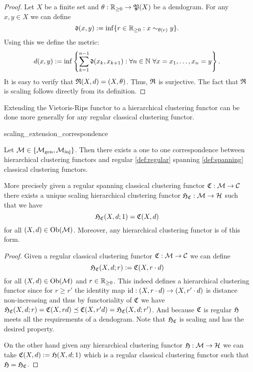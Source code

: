 \begin{proof}
Let $X$ be a finite set and $\theta: \mathbb R_{\geq0} \to \mathfrak{P}(X)$ be a dendogram. For any $x,y \in X$ we can define
$$
\mathfrak{d}(x,y) := \inf\{r \in \mathbb R_{\geq0}: x \sim_{\theta(r)} y\}.
$$
Using this we define the metric:
$$
d(x,y) := \inf\left\{\sum_{k=1}^{n-1} \mathfrak{d}(x_k, x_{k+1}): \forall n \in \mathbb N \ \forall x = x_1, \dots, x_n = y\right\}.
$$
It is easy to verify that $\mathfrak{R}(X,d) = (X,\theta)$. Thus, $\mathfrak{R}$ is surjective. The fact that $\mathfrak{R}$ is scaling follows directly from its definition.
\end{proof}



Extending the Vietoris-Rips functor to a hierarchical clustering functor can be done more generally for any regular classical clustering functor.
\begin{proposition}{}{scaling_extension_correspondence}

Let $\mathcal{M} \in \{{\mathcal{M}_\mathrm{gen}},{\mathcal{M}_\mathrm{inj}}\}$. Then there exists a one to one correspondence between
hierarchical clustering functors and regular \ref{def:regular} spanning \ref{def:spanning} classical clustering functors.

\medskip
More precisely given a regular spanning classical clustering functor $\mathfrak{C}: \mathcal{M} \to \mathcal{C}$ there exists a unique scaling hierarchical clustering functor $\mathfrak{H}_{\mathfrak{C}}: \mathcal{M} \to \mathcal{H}$ such that we have
$$
\mathfrak{H}_{\mathfrak{C}}(X,d; 1) = \mathfrak{C}(X,d)
$$
for all $(X,d) \in \mathrm {Ob}(\mathcal{M})$.
Moreover, any hierarchical clustering functor is of this form.
\end{proposition}

\begin{proof}
Given a regular classical clustering functor $\mathfrak{C}: \mathcal{M} \to \mathcal{C}$ we can define
$$
\mathfrak{H}_{\mathfrak{C}}(X,d; r) := \mathfrak{C}(X, r \cdot d)
$$
for all $(X,d) \in \mathrm {Ob}(\mathcal{M})$ and $r \in \mathbb R_{\geq0}$.
This indeed defines a hierarchical clustering functor since for $r \geq r'$ the identity map $\mathrm{id}: (X, r \cdot d) \to (X, r' \cdot d)$ is distance non-increasing and thus by functoriality of $\mathfrak{C}$ we have $\mathfrak{H}_{\mathfrak{C}}(X,d;r) = \mathfrak{C}(X, r d) \preceq \mathfrak{C}(X, r' d) = \mathfrak{H}_{\mathfrak{C}}(X,d;r')$. And because $\mathfrak{C}$ is regular $\mathfrak{H}$ meets all the requirements of a dendogram. Note that $\mathfrak{H}_{\mathfrak{C}}$ is scaling and has the desired property.




On the other hand given any hierarchical clustering functor $\mathfrak{H}: \mathcal{M} \to \mathcal{H}$ we can take $\mathfrak{C}(X,d) := \mathfrak{H}(X,d; 1)$ which is a regular classical clustering functor such that $\mathfrak{H} = \mathfrak{H}_{\mathfrak{C}}$.
\end{proof}

